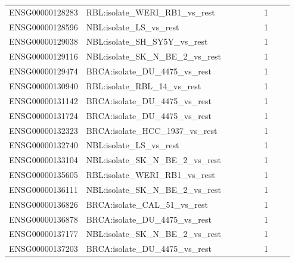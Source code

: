 \begin{landscape}
{\begin{longtable}{p{0.18\linewidth}p{0.65\linewidth}p{0.12\linewidth}}
ENSG00000128283 & RBL:isolate\_\allowbreak{}WERI\_\allowbreak{}RB1\_\allowbreak{}vs\_\allowbreak{}rest & 1 \\
ENSG00000128596 & NBL:isolate\_\allowbreak{}LS\_\allowbreak{}vs\_\allowbreak{}rest & 1 \\
ENSG00000129038 & NBL:isolate\_\allowbreak{}SH\_\allowbreak{}SY5Y\_\allowbreak{}vs\_\allowbreak{}rest & 1 \\
ENSG00000129116 & NBL:isolate\_\allowbreak{}SK\_\allowbreak{}N\_\allowbreak{}BE\_\allowbreak{}2\_\allowbreak{}vs\_\allowbreak{}rest & 1 \\
ENSG00000129474 & BRCA:isolate\_\allowbreak{}DU\_\allowbreak{}4475\_\allowbreak{}vs\_\allowbreak{}rest & 1 \\
ENSG00000130940 & RBL:isolate\_\allowbreak{}RBL\_\allowbreak{}14\_\allowbreak{}vs\_\allowbreak{}rest & 1 \\
ENSG00000131142 & BRCA:isolate\_\allowbreak{}DU\_\allowbreak{}4475\_\allowbreak{}vs\_\allowbreak{}rest & 1 \\
ENSG00000131724 & BRCA:isolate\_\allowbreak{}DU\_\allowbreak{}4475\_\allowbreak{}vs\_\allowbreak{}rest & 1 \\
ENSG00000132323 & BRCA:isolate\_\allowbreak{}HCC\_\allowbreak{}1937\_\allowbreak{}vs\_\allowbreak{}rest & 1 \\
ENSG00000132740 & NBL:isolate\_\allowbreak{}LS\_\allowbreak{}vs\_\allowbreak{}rest & 1 \\
ENSG00000133104 & NBL:isolate\_\allowbreak{}SK\_\allowbreak{}N\_\allowbreak{}BE\_\allowbreak{}2\_\allowbreak{}vs\_\allowbreak{}rest & 1 \\
ENSG00000135605 & RBL:isolate\_\allowbreak{}WERI\_\allowbreak{}RB1\_\allowbreak{}vs\_\allowbreak{}rest & 1 \\
ENSG00000136111 & NBL:isolate\_\allowbreak{}SK\_\allowbreak{}N\_\allowbreak{}BE\_\allowbreak{}2\_\allowbreak{}vs\_\allowbreak{}rest & 1 \\
ENSG00000136826 & BRCA:isolate\_\allowbreak{}CAL\_\allowbreak{}51\_\allowbreak{}vs\_\allowbreak{}rest & 1 \\
ENSG00000136878 & BRCA:isolate\_\allowbreak{}DU\_\allowbreak{}4475\_\allowbreak{}vs\_\allowbreak{}rest & 1 \\
ENSG00000137177 & NBL:isolate\_\allowbreak{}SK\_\allowbreak{}N\_\allowbreak{}BE\_\allowbreak{}2\_\allowbreak{}vs\_\allowbreak{}rest & 1 \\
ENSG00000137203 & BRCA:isolate\_\allowbreak{}DU\_\allowbreak{}4475\_\allowbreak{}vs\_\allowbreak{}rest & 1 \\

\end{longtable}}
\end{landscape}
